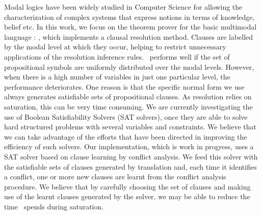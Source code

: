 Modal logics have been widely studied in Computer Science for allowing the
characterization of complex systems that express notions in terms of knowledge,
belief etc. In this work, we focus on the theorem prover for the basic
multimodal language : \ksp, which implements a clausal resolution
method. Clauses are labelled by the modal level at which they occur, helping to
restrict unnecessary applications of the resolution inference rules.  
\ksp\ performs well if the set of propositional symbols are uniformly distributed
over the modal levels. However, when there is a high number of 
variables in just one particular level, the performance deteriorates. One reason
is that the specific normal form we use always generates satisfiable sets of
propositional clauses. As resolution relies on saturation, this can be very time
consuming. We are currently investigating the use of Boolean Satisfiability
Solvers (SAT solvers), once they are able to solve hard structured problems
with several variables and constraints. We believe that
we can take advantage of the efforts that have been directed in improving the
efficiency of such solvers. 
Our implementation, which is work in progress, uses a SAT solver based on clause
learning by conflict analysis. We feed this solver with the satisfiable sets of
clauses generated by translation and, each time it identifies a conflict, one or
more new clauses are learnt from the conflict analysis procedure. We believe
that by carefully choosing the set of clauses and making use of the learnt
clauses generated by the solver, we may be able to reduce the time \ksp\ spends
during saturation. 


